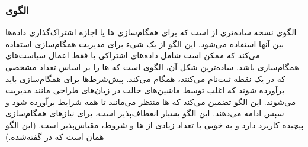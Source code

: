 \subsubsection{الگوی }
\label{archConRendezSec}
\begin{RTL}
الگوی  \cite{ref4} نسخه
ساده‌تری از  است
که برای همگام‌سازی ها یا اجازه اشتراک‌گذاری داده‌ها بین آنها استفاده می‌شود.
این الگو از یک شیء  برای مدیریت همگام‌سازی استفاده می‌کند
که ممکن است شامل داده‌های اشتراکی یا فقط اعمال سیاست‌های همگام‌سازی باشد.
ساده‌ترین شکل آن، الگوی  است که
ها را بر اساس تعداد مشخصی که در یک نقطه ثبت‌نام می‌کنند،
همگام می‌کند. پیش‌شرط‌ها برای همگام‌سازی باید برآورده شوند که
اغلب توسط ماشین‌های حالت در زبان‌های طراحی مانند  مدیریت می‌شوند.
این الگو تضمین می‌کند که ها منتظر می‌مانند
تا همه شرایط برآورده شود و سپس ادامه می‌دهند.
این الگو بسیار انعطاف‌پذیر است، برای نیازهای همگام‌سازی پیچیده کاربرد دارد
و به خوبی با تعداد زیادی از ها و شروط، مقیاس‌پذیر است.
(این الگو همان  است
که در \cite{ref1} گفته‌شده.)
\end{RTL}